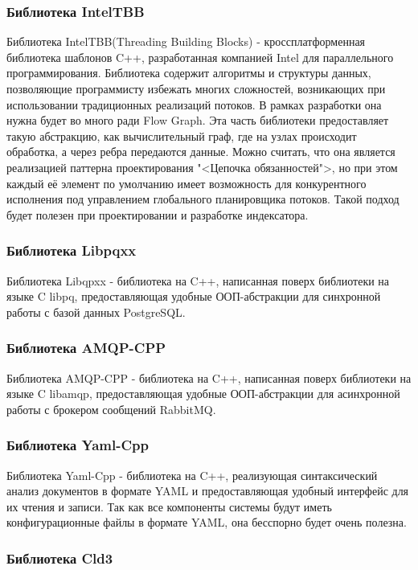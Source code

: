\subsubsection{Библиотека IntelTBB}

Библиотека IntelTBB(Threading Building Blocks) - кроссплатформенная библиотека шаблонов C++, разработанная компанией Intel для параллельного программирования. Библиотека содержит алгоритмы и структуры данных, позволяющие программисту избежать многих сложностей, возникающих при использовании традиционных реализаций потоков. В рамках разработки она нужна будет во много ради Flow Graph. Эта часть библиотеки предоставляет такую абстракцию, как вычислительный граф, где на узлах происходит обработка, а через ребра передаются данные. Можно считать, что она является реализацией паттерна проектирования "<Цепочка обязанностей">, но при этом каждый её элемент по умолчанию имеет возможность для конкурентного исполнения под управлением глобального планировщика потоков. Такой подход будет полезен при проектировании и разработке индексатора.

\subsubsection{Библиотека Libpqxx}

Библиотека Libqpxx - библиотека на C++, написанная поверх библиотеки на языке C libpq, предоставляющая удобные ООП-абстракции для синхронной работы с базой данных PostgreSQL.

\subsubsection{Библиотека AMQP-CPP}

Библиотека AMQP-CPP - библиотека на C++, написанная поверх библиотеки на языке C libamqp, предоставляющая удобные ООП-абстракции для асинхронной работы с брокером сообщений RabbitMQ.

\subsubsection{Библиотека Yaml-Cpp}

Библиотека Yaml-Cpp - библиотека на C++, реализующая синтаксический анализ документов в формате YAML и предоставляющая удобный интерфейс для их чтения и записи. Так как все компоненты системы будут иметь конфигурационные файлы в формате YAML, она бесспорно будет очень полезна.

\subsubsection{Библиотека Cld3}

